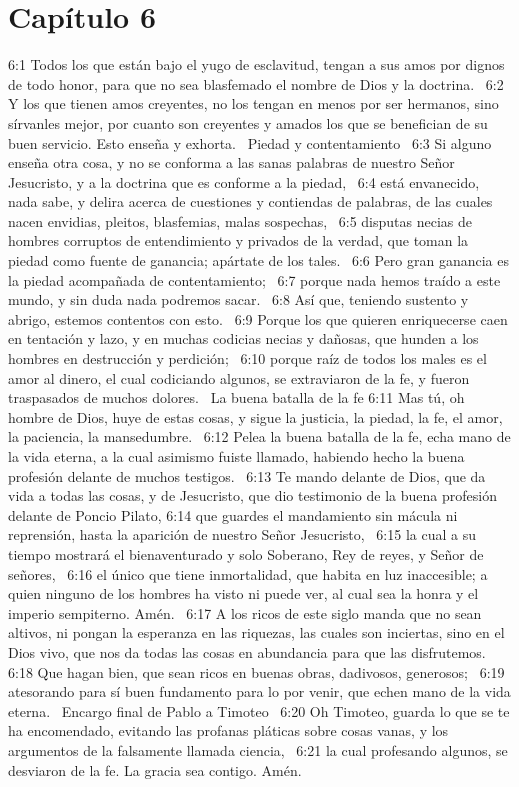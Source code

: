 \section*{Capítulo 6 }

6:1 Todos los que están bajo el yugo de esclavitud, tengan a sus amos por dignos de todo honor, para que no sea blasfemado el nombre de Dios y la doctrina.  
6:2 Y los que tienen amos creyentes, no los tengan en menos por ser hermanos, sino sírvanles mejor, por cuanto son creyentes y amados los que se benefician de su buen servicio. Esto enseña y exhorta.  
Piedad y contentamiento  
6:3 Si alguno enseña otra cosa, y no se conforma a las sanas palabras de nuestro Señor Jesucristo, y a la doctrina que es conforme a la piedad,  
6:4 está envanecido, nada sabe, y delira acerca de cuestiones y contiendas de palabras, de las cuales nacen envidias, pleitos, blasfemias, malas sospechas,  
6:5 disputas necias de hombres corruptos de entendimiento y privados de la verdad, que toman la piedad como fuente de ganancia; apártate de los tales.  
6:6 Pero gran ganancia es la piedad acompañada de contentamiento;  
6:7 porque nada hemos traído a este mundo, y sin duda nada podremos sacar.  
6:8 Así que, teniendo sustento y abrigo, estemos contentos con esto.  
6:9 Porque los que quieren enriquecerse caen en tentación y lazo, y en muchas codicias necias y dañosas, que hunden a los hombres en destrucción y perdición;  
6:10 porque raíz de todos los males es el amor al dinero, el cual codiciando algunos, se extraviaron de la fe, y fueron traspasados de muchos dolores.  
La buena batalla de la fe 
6:11 Mas tú, oh hombre de Dios, huye de estas cosas, y sigue la justicia, la piedad, la fe, el amor, la paciencia, la mansedumbre.  
6:12 Pelea la buena batalla de la fe, echa mano de la vida eterna, a la cual asimismo fuiste llamado, habiendo hecho la buena profesión delante de muchos testigos.  
6:13 Te mando delante de Dios, que da vida a todas las cosas, y de Jesucristo, que dio testimonio de la buena profesión delante de Poncio Pilato, 
6:14 que guardes el mandamiento sin mácula ni reprensión, hasta la aparición de nuestro Señor Jesucristo,  
6:15 la cual a su tiempo mostrará el bienaventurado y solo Soberano, Rey de reyes, y Señor de señores,  
6:16 el único que tiene inmortalidad, que habita en luz inaccesible; a quien ninguno de los hombres ha visto ni puede ver, al cual sea la honra y el imperio sempiterno. Amén.  
6:17 A los ricos de este siglo manda que no sean altivos, ni pongan la esperanza en las riquezas, las cuales son inciertas, sino en el Dios vivo, que nos da todas las cosas en abundancia para que las disfrutemos.  
6:18 Que hagan bien, que sean ricos en buenas obras, dadivosos, generosos;  
6:19 atesorando para sí buen fundamento para lo por venir, que echen mano de la vida eterna.  
Encargo final de Pablo a Timoteo  
6:20 Oh Timoteo, guarda lo que se te ha encomendado, evitando las profanas pláticas sobre cosas vanas, y los argumentos de la falsamente llamada ciencia,  
6:21 la cual profesando algunos, se desviaron de la fe. La gracia sea contigo. Amén. 